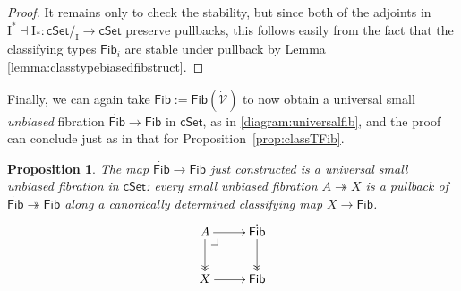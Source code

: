 \documentclass[11pt,reqno]{amsart}
\makeatletter
\newcommand{\cSet}{\ensuremath{\mathsf{cSet}}}
\newcommand{\ra}{\ensuremath{\rightarrow}}
\newcommand{\fib}{\ensuremath{\twoheadrightarrow}}
\newcommand{\I}{\ensuremath{\mathrm{I}}}
\newcommand{\VV}{\ensuremath{\dot{\mathcal{V}}}}
\newcommand{\Fib}{\ensuremath{\mathsf{Fib}}}
\newcommand{\FFib}{\ensuremath{\dot{\mathsf{Fib}}}}
\newtheorem{proposition}[theorem]{Proposition}
\theoremstyle{remark}
\theoremstyle{definition}
\newcommand{\pbcorner}[1][dr]{\save*!/#1-1.2pc/#1:(-1,1)@^{|-}\restore}
\makeatother
\begin{document}
\begin{proof} It remains only to check the stability, but since both of the adjoints in $\I^* \dashv \I_* : \cSet/_\I \ra\cSet$ preserve pullbacks, this follows easily from the fact that the classifying types $\Fib_i$ are stable under pullback by Lemma \ref{lemma:classtypebiasedfibstruct}.
\end{proof}

Finally, we can again take $\Fib := \Fib(\VV)$ to now obtain a universal small \emph{unbiased} fibration $\FFib\ra\Fib$ in $\cSet$, as in \eqref{diagram:universalfib}, and the proof can conclude just as in that for Proposition~\ref{prop:classTFib}.  

\begin{proposition}\label{prop:UniversalunbiasedFib}
The map $\FFib\ra\Fib$ just constructed is a \emph{universal small unbiased fibration} in $\cSet$: every small unbiased fibration $A \fib X$ is a pullback of $\FFib \fib \Fib$ along a canonically determined classifying map $X\ra \Fib$.
\begin{equation}\label{diagram:classifyfib2}
\xymatrix{
A \ar@{>>}[d] \ar[r]  \pbcorner & \FFib \ar@{>>}[d] \\
X \ar[r] & \Fib
}
\end{equation}
\end{proposition}
\end{document}
